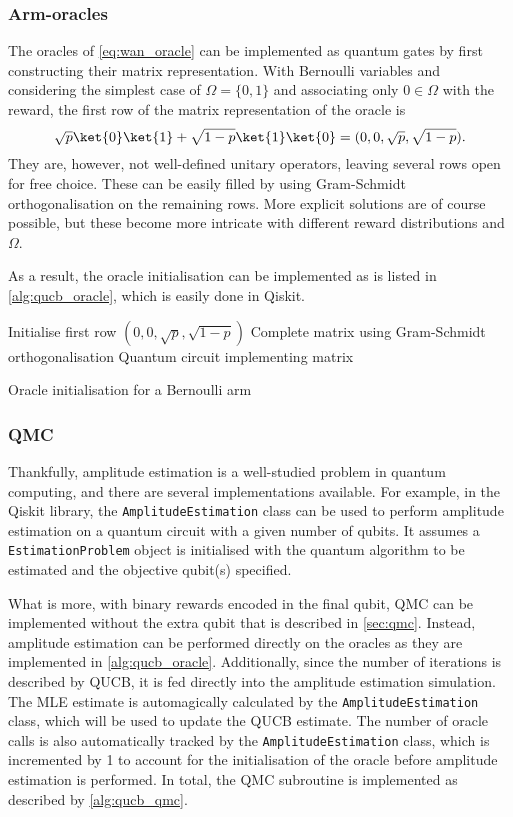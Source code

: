 \subsubsection{Arm-oracles}
The oracles of \cref{eq:wan_oracle} can be implemented as quantum gates by first constructing their matrix representation.
With Bernoulli variables and considering the simplest case of $\Omega = \{0, 1\}$ and associating only $0 \in \Omega$ with the reward, the first row of the matrix representation of the oracle is
\begin{equation}
    \sqrt{p} \ket{0} \ket{1} + \sqrt{1-p} \ket{1} \ket{0}
    =
    (0, 0, \sqrt{p}, \sqrt{1-p}).
\end{equation}
They are, however, not well-defined unitary operators, leaving several rows open for free choice.
These can be easily filled by using Gram-Schmidt orthogonalisation on the remaining rows.
More explicit solutions are of course possible, but these become more intricate with different reward distributions and $\Omega$.

As a result, the oracle initialisation can be implemented as is listed in \cref{alg:qucb_oracle}, which is easily done in Qiskit.

\begin{algorithm}
    \SetAlgoLined
    Initialise first row $(0, 0, \sqrt{p}, \sqrt{1-p})$ \;
    Complete matrix using Gram-Schmidt orthogonalisation \;
    \Return Quantum circuit implementing matrix
    \caption{Oracle initialisation for a Bernoulli arm}
    \label{alg:qucb_oracle}
\end{algorithm}

\subsubsection{QMC}
Thankfully, amplitude estimation is a well-studied problem in quantum computing, and there are several implementations available.
For example, in the Qiskit library, the \texttt{AmplitudeEstimation} class can be used to perform amplitude estimation on a quantum circuit with a given number of qubits.
It assumes a \texttt{EstimationProblem} object is initialised with the quantum algorithm to be estimated and the objective qubit(s) specified.

What is more, with binary rewards encoded in the final qubit, QMC can be implemented without the extra qubit that is described in \cref{sec:qmc}.
Instead, amplitude estimation can be performed directly on the oracles as they are implemented in \cref{alg:qucb_oracle}.
Additionally, since the number of iterations is described by QUCB, it is fed directly into the amplitude estimation simulation.
The MLE estimate is automagically calculated by the \texttt{AmplitudeEstimation} class\footnotemark, which will be used to update the QUCB estimate.
The number of oracle calls is also automatically tracked by the \texttt{AmplitudeEstimation} class, which is incremented by 1 to account for the initialisation of the oracle before amplitude estimation is performed.
In total, the QMC subroutine is implemented as described by \cref{alg:qucb_qmc}.

